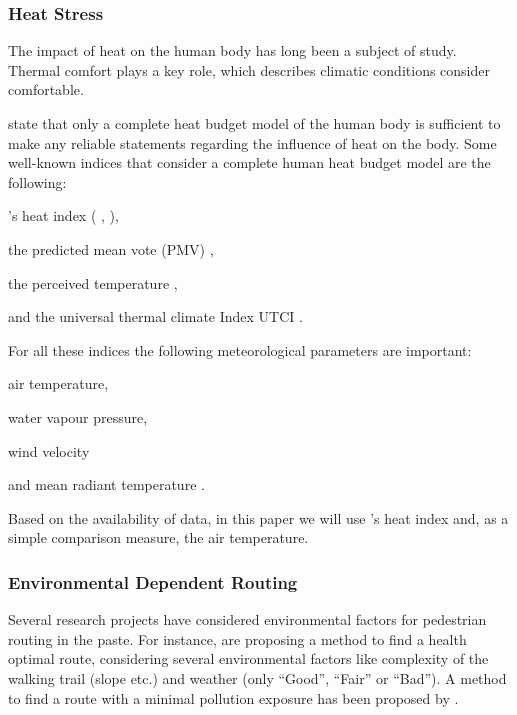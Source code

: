 \subsubsection{Heat Stress}
The impact of heat on the human body has long been a subject of study. Thermal comfort plays a key role, which describes climatic conditions consider comfortable. 

\textcite{Staiger1997} state that only a complete heat budget model of the human body is sufficient to make any reliable statements regarding the influence of heat on the body. Some well-known indices that consider a complete human heat budget model are the following:
\begin{inparaenum}[(1)]
  \item \citeauthor{Steadman1979}'s heat index (\citeauthor{Steadman1979} \citeyear*{Steadman1979}, \citeyear*{Steadman1979a}),
  \item the predicted mean vote (PMV) \parencite{Fanger1973},
  \item the perceived temperature \parencite{Staiger1997,Jendritzky2000},
  \item and the universal thermal climate Index UTCI \parencite{Jendritzky2010}.
\end{inparaenum}

For all these indices the following meteorological parameters are important:
\begin{inparaenum}[(1)]
\item air temperature,
\item water vapour pressure,
\item wind velocity 
\item and mean radiant temperature \parencite{Jendritzky2010}.
\end{inparaenum}

Based on the availability of data, in this paper we will use \citeauthor{Steadman1979}'s heat index \parencite{Steadman1979} and, as a simple comparison measure, the air temperature.

\subsubsection{Environmental Dependent Routing}
Several research projects have considered environmental factors for pedestrian routing in the paste. For instance, \textcite{Sharker2012} are proposing a method to find a health optimal route, considering several environmental factors like complexity of the walking trail (slope etc.) and weather (only “Good”, “Fair” or “Bad”). A method to find a route with a minimal pollution exposure has been proposed by \textcite{Hasenfratz2015}.

